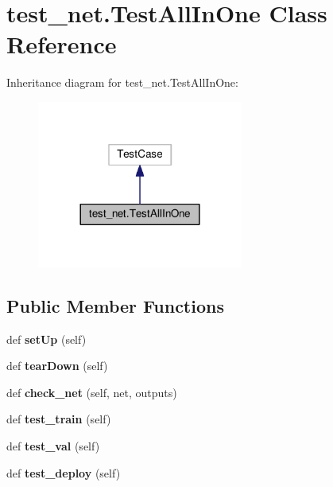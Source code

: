 \hypertarget{classtest__net_1_1_test_all_in_one}{}\section{test\+\_\+net.\+Test\+All\+In\+One Class Reference}
\label{classtest__net_1_1_test_all_in_one}


Inheritance diagram for test\+\_\+net.\+Test\+All\+In\+One\+:
\nopagebreak
\begin{figure}[H]
\begin{center}
\leavevmode
\includegraphics[width=192pt]{classtest__net_1_1_test_all_in_one__inherit__graph}
\end{center}
\end{figure}
\subsection*{Public Member Functions}
\begin{DoxyCompactItemize}
\item 
\mbox{\label{classtest__net_1_1_test_all_in_one_a0f99b76c5cb5e6df0aaa1adf59f561b8}} 
def {\bfseries set\+Up} (self)
\item 
\mbox{\label{classtest__net_1_1_test_all_in_one_ac1e0e5f030f559585b13a1a0c7d087b2}} 
def {\bfseries tear\+Down} (self)
\item 
\mbox{\label{classtest__net_1_1_test_all_in_one_a09a59a951d011ccbf850117f339ce168}} 
def {\bfseries check\+\_\+net} (self, net, outputs)
\item 
\mbox{\label{classtest__net_1_1_test_all_in_one_a91c48d7c53d2c9ac8bbf615832d27e7f}} 
def {\bfseries test\+\_\+train} (self)
\item 
\mbox{\label{classtest__net_1_1_test_all_in_one_a35bcd7c11aae61ade78ec33f6543cb6f}} 
def {\bfseries test\+\_\+val} (self)
\item 
\mbox{\label{classtest__net_1_1_test_all_in_one_a1d4b4cea08e5f6dcc9a375fb3cfecd46}} 
def {\bfseries test\+\_\+deploy} (self)
\end{DoxyCompactItemize}
